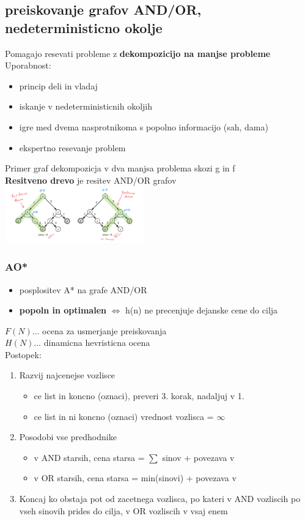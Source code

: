 \subsection{preiskovanje grafov AND/OR, nedeterministicno okolje}
Pomagajo resevati probleme z \textbf{dekompozicijo na manjse probleme}
Uporabnost:
\begin{itemize}[noitemsep,topsep=0pt,leftmargin=*]
    \item princip deli in vladaj
    \item iskanje v nedeterministicnih okoljih 
    \item igre med dvema nasprotnikoma s popolno informacijo (sah, dama)
    \item ekspertno resevanje problem
\end{itemize}
Primer graf dekompozicja v dva manjsa problema skozi g in f\\
\textbf{Resitveno drevo} je resitev AND/OR grafov\\
\includegraphics[width=6cm]{./images/resitveno-drevo.png}
\subsubsection{AO*}
\begin{itemize}[noitemsep,topsep=0pt,leftmargin=*]
    \item posplositev A* na grafe AND/OR
    \item \textbf{popoln in optimalen} $\Leftrightarrow$ h(n) ne precenjuje dejanske cene do cilja
\end{itemize}
$F(N) \dots$ ocena za usmerjanje preiskovanja\\ 
$H(N) \dots$ dinamicna hevristicna ocena\\
Postopek:
\begin{enumerate}[noitemsep,topsep=0pt,leftmargin=*]
    \item Razvij najcenejse vozlisce
    \begin{itemize}[noitemsep,topsep=0pt,leftmargin=*]
        \item ce list in koncno (oznaci), preveri 3. korak, nadaljuj v 1.
        \item ce list in ni koncno (oznaci) vrednost vozlisca = $\infty$
    \end{itemize}
    \item Posodobi vse predhodnike
    \begin{itemize}[noitemsep,topsep=0pt,leftmargin=*]
        \item v AND starsih, cena starsa = $\sum$ sinov + povezava v
        \item v OR starsih, cena starsa = min(sinovi) + povezava v
    \end{itemize}
    \item Koncaj ko obstaja pot od zacetnega vozlisca, po kateri v AND vozliscih po vseh sinovih prides do cilja, v OR vozliscih v vsaj enem
\end{enumerate}

